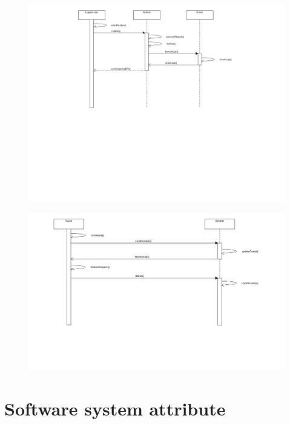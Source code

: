 \begin{center}
	\begin{figure} [h]
    	\includegraphics [scale=0.4]{sequencecall.png}
	\end{figure}
	\end{center}
	\newpage

\begin{center}
	\begin{figure} [h]
    	\includegraphics [scale=0.4]{sequencerefuse.png}
	\end{figure}
	\end{center}
	\newpage





\section{Software system attribute}
